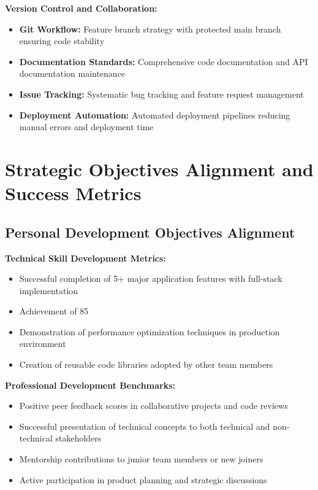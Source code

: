 \textbf{Version Control and Collaboration:}
\begin{itemize}
    \item \textbf{Git Workflow:} Feature branch strategy with protected main branch ensuring code stability
    \item \textbf{Documentation Standards:} Comprehensive code documentation and API documentation maintenance
    \item \textbf{Issue Tracking:} Systematic bug tracking and feature request management
    \item \textbf{Deployment Automation:} Automated deployment pipelines reducing manual errors and deployment time
\end{itemize}

\section{Strategic Objectives Alignment and Success Metrics}

\subsection{Personal Development Objectives Alignment}

\textbf{Technical Skill Development Metrics:}
\begin{itemize}
    \item Successful completion of 5+ major application features with full-stack implementation
    \item Achievement of 85%
    \item Demonstration of performance optimization techniques in production environment
    \item Creation of reusable code libraries adopted by other team members
\end{itemize}

\textbf{Professional Development Benchmarks:}
\begin{itemize}
    \item Positive peer feedback scores in collaborative projects and code reviews
    \item Successful presentation of technical concepts to both technical and non-technical stakeholders
    \item Mentorship contributions to junior team members or new joiners
    \item Active participation in product planning and strategic discussions
\end{itemize}

